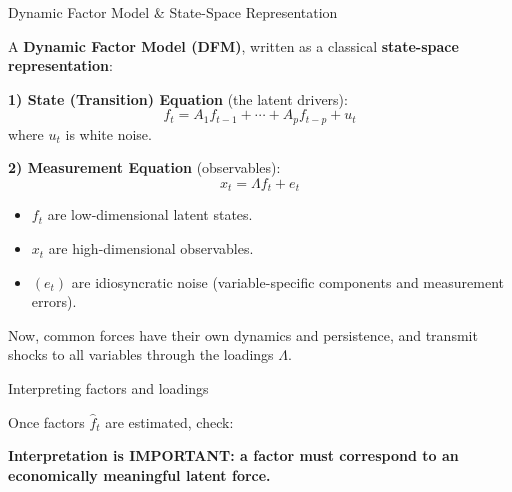 \documentclass{beamer}
\begin{document}
\begin{frame}{Dynamic Factor Model \& State-Space Representation}
\small

A \textbf{Dynamic Factor Model (DFM)}, written as a classical \textbf{state-space representation}:

\medskip
\textbf{1) State (Transition) Equation} (the latent drivers):
\[
f_t = A_1 f_{t-1} + \cdots + A_p f_{t-p} + u_t
\]
where $u_t$ is white noise.

\medskip

\textbf{2) Measurement Equation} (observables):
\[
x_t = \Lambda f_t + e_t
\]
\begin{itemize}
  \item $f_t$ are low-dimensional latent states.
  \item $x_t$ are high-dimensional observables.
  \item $(e_t)$ are idiosyncratic noise (variable-specific components and measurement errors).
\end{itemize}

\medskip
Now, common forces have their own dynamics and persistence, and transmit shocks to all variables through the loadings $\Lambda$.

\end{frame}



\begin{frame}{Interpreting factors and loadings}
\small

Once factors $\hat{f}_t$ are estimated, check:


\medskip
\textbf{Interpretation is IMPORTANT: a factor must correspond to an economically meaningful latent force.}
\end{frame}
\end{document}
